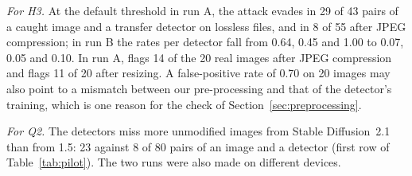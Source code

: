 \emph{For H3.} At the default threshold in run A, the attack evades in 29 of 43 pairs of a caught
image and a transfer detector on lossless files, and in 8 of 55 after JPEG compression; in run B
the rates per detector fall from 0.64, 0.45 and 1.00 to 0.07, 0.05 and 0.10. In run A, \detS flags
14 of the 20 real images after JPEG compression and \detE flags 11 of 20 after resizing. A
false-positive rate of 0.70 on 20 images may also point to a mismatch between our pre-processing
and that of the detector's training, which is one reason for the check of
Section~\ref{sec:preprocessing}.

\emph{For Q2.} The detectors miss more unmodified images from Stable Diffusion~2.1 than from 1.5:
23 against 8 of 80 pairs of an image and a detector (first row of Table~\ref{tab:pilot}). The two
runs were also made on different devices.
